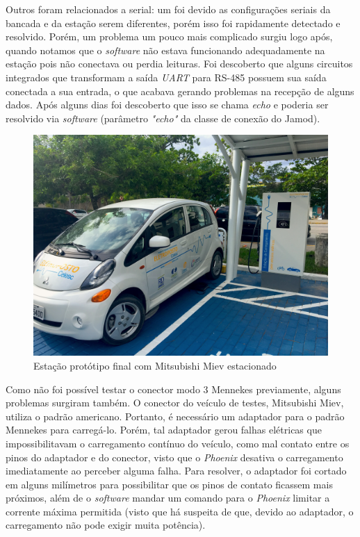     Outros foram relacionados a serial: um foi devido as configurações seriais da bancada e da estação serem diferentes, porém isso foi rapidamente detectado e resolvido. Porém, um problema um pouco mais complicado surgiu logo após, quando notamos que o \textit{software} não estava funcionando adequadamente na estação pois não conectava ou perdia leituras. Foi descoberto que alguns circuitos integrados que transformam a saída \textit{\ac{UART}} para RS-485 possuem sua saída conectada a sua entrada, o que acabava gerando problemas na recepção de alguns dados. Após alguns dias foi descoberto que isso se chama \textit{echo} e poderia ser resolvido via \textit{software} (parâmetro \textit{"echo"} da classe de conexão do Jamod).

    \begin{figure}[H]
      \begin{center}
        \includegraphics[width=.75\textwidth,natwidth=4032,natheight=3024]{assets/images/evse.jpg}
        \caption{Estação protótipo final com Mitsubishi Miev estacionado}
        \label{fig:evse}
      \end{center}
    \end{figure}

    Como não foi possível testar o conector modo 3 Mennekes previamente, alguns problemas surgiram também. O conector do veículo de testes, Mitsubishi Miev, utiliza o padrão americano. Portanto, é necessário um adaptador para o padrão Mennekes para carregá-lo. Porém, tal adaptador gerou falhas elétricas que impossibilitavam o carregamento contínuo do veículo, como mal contato entre os pinos do adaptador e do conector, visto que o \textit{Phoenix} desativa o carregamento imediatamente ao perceber alguma falha. Para resolver, o adaptador foi cortado em alguns milímetros para possibilitar que os pinos de contato ficassem mais próximos, além de o \textit{software} mandar um comando para o \textit{Phoenix} limitar a corrente máxima permitida (visto que há suspeita de que, devido ao adaptador, o carregamento não pode exigir muita potência).

